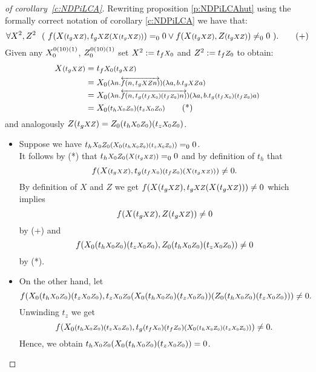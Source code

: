 %
%
\begin{proof}[ of corollary~\ref{c:NDPiLCA}]
Rewriting proposition \ref{p:NDPiLCAhut} using the formally correct notation
of corollary \ref{c:NDPiLCA} we have that:
\[
  \forall X^2,Z^2\ \ (\ 
      f(X\args{(t_g\args{XZ})}, t_g\args{XZ (X \args{(t_gXZ)})})=_00 \vee 
      f(X\args{(t_g\args{XZ})}, Z\args{(t_g\args{XZ})} )\neq_00\ )
\text{.}\tag{+}
\]
Given any $X^{0(10)(1)}_0$, $Z^{0(10)(1)}_0$ set $X^2:=t_f\args{X_0}$ and $Z^2:=t_f\args{Z_0}$ to
obtain:
\begin{align*}
X\args{(t_g\args{XZ})}&= t_f\args{X_0(t_g\args{XZ})}\\
        &= X_0 \args 
         {(\lambda n . \overleftrightarrow{f(n,t_g\args{XZ}n)})
          (\lambda a,b . t_g\args{XZ}a)} \\
        &= X_0 \args
         {(\lambda n . \overleftrightarrow{f(n,t_g\args{(t_f\args{X_0})(t_f\args{Z_0})}n)}) 
          (\lambda a,b . t_g\args{(t_f\args{X_0})(t_f\args{Z_0})}a)} \\
        &= X_0\args{(t_h\args{X_0Z_0})(t_z\args{X_0Z_0})} \tag{*}
\end{align*}
and analogously $Z(t_g\args{XZ})=Z_0(t_h\args{X_0Z_0})(t_z\args{X_0Z_0})$. 
\begin{itemize}
\item Suppose we have $t_h\args{X_0Z_0(X_0\args{ (t_h\args{X_0Z_0})(t_z\args{X_0Z_0}) })}=_00$.\\
It follows by (*) that $t_h\args{X_0Z_0(X\args{(t_g\args{XZ})})}=_00$ and by 
definition of $t_h$ that
\[
f( X\args{(t_g\args{XZ})}, 
   t_g\args{ (t_f\args{X_0}) (t_f\args{Z_0}) (X\args{(t_g\args{XZ})}) } ) \neq 0
\text{.}\]
By definition of $X$ and $Z$ we get $ f(X(t_g\args{XZ}),t_g\args{XZ}(X(t_g\args{XZ})))\neq 0$ which
implies 
\[f(X(t_g\args{XZ}),Z(t_g\args{XZ}))\neq0\] by (+) and 
\[
f(X_0(t_h\args{X_0Z_0})(t_z\args{X_0Z_0}),Z_0(t_h\args{X_0Z_0})(t_z\args{X_0Z_0}))\neq 0
\] by (*).
\item On the other hand, let 
\[
f( X_0(t_h\args{X_0Z_0})(t_z\args{X_0Z_0}) , t_z\args{X_0Z_0}(X_0(t_h\args{X_0Z_0})(t_z\args{X_0Z_0}))(Z_0(t_h\args{X_0Z_0})(t_z\args{X_0Z_0}))) \neq 0 \text{.}
\]
Unwinding $t_z$ we get
\[
 f( X_0\args{(t_h\args{X_0Z_0})(t_z\args{X_0Z_0})}  , 
    t_g\args{ (t_f\args{X_0}) (t_f\args{Z_0}) (X_0\args{ (t_h\args{X_0Z_0}) (t_z\args{X_0Z_0}) }) } )
         \neq 0
\text{.}
\]
Hence, we obtain $t_h\args{X_0Z_0}(X_0(t_h\args{X_0Z_0})(t_z\args{X_0Z_0})) = 0$.
\end{itemize}
\end{proof}

